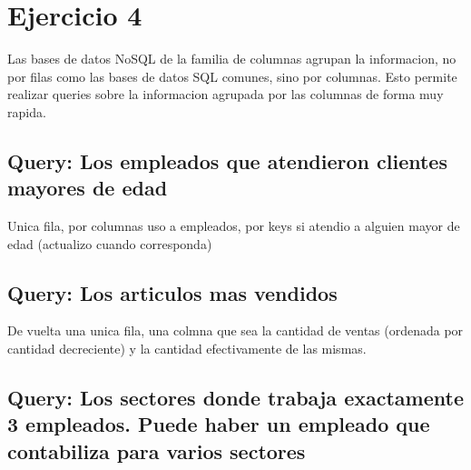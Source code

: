 \section{Ejercicio 4}

Las bases de datos NoSQL de la familia de columnas agrupan la informacion, no por filas como las bases de datos SQL comunes, sino por columnas. Esto permite realizar queries sobre la informacion agrupada por las columnas de forma muy rapida.

\subsection{Query: Los empleados que atendieron clientes mayores de edad}

Unica fila, por columnas uso a empleados, por keys si atendio a alguien mayor de edad (actualizo cuando corresponda)

\subsection{Query: Los articulos mas vendidos}

De vuelta una unica fila, una colmna que sea la cantidad de ventas (ordenada por cantidad decreciente) y la cantidad efectivamente de las mismas.

\subsection{Query: Los sectores donde trabaja exactamente 3 empleados. Puede haber un empleado que contabiliza para varios sectores}

